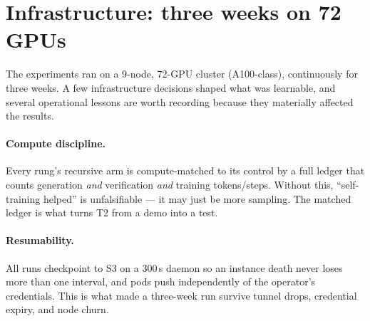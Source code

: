 \section{Infrastructure: three weeks on 72 GPUs}
The experiments ran on a 9-node, 72-GPU cluster (A100-class), continuously for three weeks. A few
infrastructure decisions shaped what was learnable, and several operational lessons are worth recording because
they materially affected the results.

\paragraph{Compute discipline.} Every rung's recursive arm is compute-matched to its control by a full ledger
that counts generation \emph{and} verification \emph{and} training tokens/steps. Without this, ``self-training
helped'' is unfalsifiable --- it may just be more sampling. The matched ledger is what turns T2 from a demo into
a test.

\paragraph{Resumability.} All runs checkpoint to S3 on a 300\,s daemon so an instance death never loses more
than one interval, and pods push independently of the operator's credentials. This is what made a three-week
run survive tunnel drops, credential expiry, and node churn.

